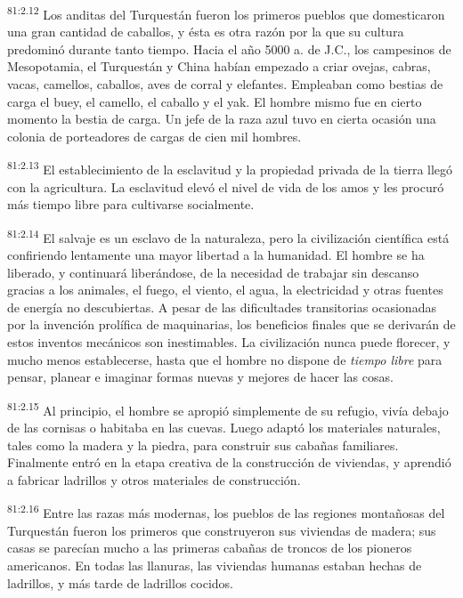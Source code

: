 \par
\textsuperscript{81:2.12} Los anditas del Turquestán fueron los primeros pueblos que domesticaron una gran cantidad de caballos, y ésta es otra razón por la que su cultura predominó durante tanto tiempo. Hacia el año 5000 a. de J.C., los campesinos de Mesopotamia, el Turquestán y China habían empezado a criar ovejas, cabras, vacas, camellos, caballos, aves de corral y elefantes. Empleaban como bestias de carga el buey, el camello, el caballo y el yak. El hombre mismo fue en cierto momento la bestia de carga. Un jefe de la raza azul tuvo en cierta ocasión una colonia de porteadores de cargas de cien mil hombres.

\par
\textsuperscript{81:2.13} El establecimiento de la esclavitud y la propiedad privada de la tierra llegó con la agricultura. La esclavitud elevó el nivel de vida de los amos y les procuró más tiempo libre para cultivarse socialmente.

\par
\textsuperscript{81:2.14} El salvaje es un esclavo de la naturaleza, pero la civilización científica está confiriendo lentamente una mayor libertad a la humanidad. El hombre se ha liberado, y continuará liberándose, de la necesidad de trabajar sin descanso gracias a los animales, el fuego, el viento, el agua, la electricidad y otras fuentes de energía no descubiertas. A pesar de las dificultades transitorias ocasionadas por la invención prolífica de maquinarias, los beneficios finales que se derivarán de estos inventos mecánicos son inestimables. La civilización nunca puede florecer, y mucho menos establecerse, hasta que el hombre no dispone de \textit{tiempo libre} para pensar, planear e imaginar formas nuevas y mejores de hacer las cosas.

\par
\textsuperscript{81:2.15} Al principio, el hombre se apropió simplemente de su refugio, vivía debajo de las cornisas o habitaba en las cuevas. Luego adaptó los materiales naturales, tales como la madera y la piedra, para construir sus cabañas familiares. Finalmente entró en la etapa creativa de la construcción de viviendas, y aprendió a fabricar ladrillos y otros materiales de construcción.

\par
\textsuperscript{81:2.16} Entre las razas más modernas, los pueblos de las regiones montañosas del Turquestán fueron los primeros que construyeron sus viviendas de madera; sus casas se parecían mucho a las primeras cabañas de troncos de los pioneros americanos. En todas las llanuras, las viviendas humanas estaban hechas de ladrillos, y más tarde de ladrillos cocidos.

